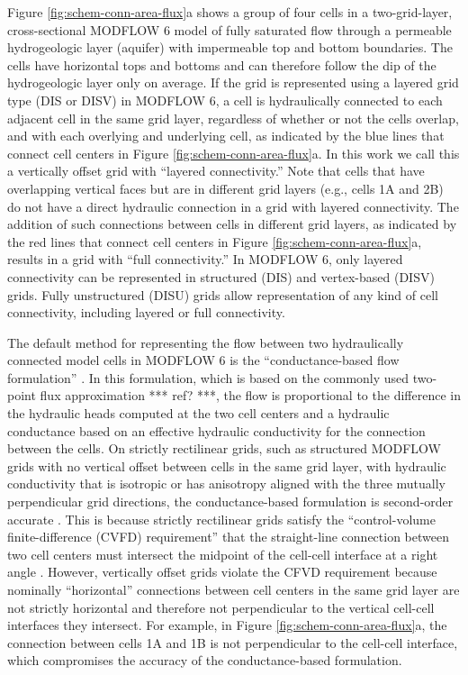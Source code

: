 \documentclass{article}
\begin{document}
Figure \ref{fig:schem-conn-area-flux}a shows a group of four cells in a two-grid-layer, cross-sectional MODFLOW 6 model of fully saturated flow through a permeable hydrogeologic layer (aquifer) with impermeable top and bottom boundaries. The cells have horizontal tops and bottoms and can therefore follow the dip of the hydrogeologic layer only on average. If the grid is represented using a layered grid type (DIS or DISV) in MODFLOW 6, a cell is hydraulically connected to each adjacent cell in the same grid layer, regardless of whether or not the cells overlap, and with each overlying and underlying cell, as indicated by the blue lines that connect cell centers in Figure \ref{fig:schem-conn-area-flux}a. In this work we call this a vertically offset grid with ``layered connectivity.''  Note that cells that have overlapping vertical faces but are in different grid layers (e.g., cells 1A and 2B) do not have a direct hydraulic connection in a grid with layered connectivity. The addition of such connections between cells in different grid layers, as indicated by the red lines that connect cell centers in Figure \ref{fig:schem-conn-area-flux}a, results in a grid with ``full connectivity.''  In MODFLOW 6, only layered connectivity can be represented in structured (DIS) and vertex-based (DISV) grids. Fully unstructured (DISU) grids allow representation of any kind of cell connectivity, including layered or full connectivity.

The default method for representing the flow between two hydraulically connected model cells in MODFLOW 6 is the ``conductance-based flow formulation'' \citep{modflow6gwf}. In this formulation, which is based on the commonly used two-point flux approximation {\color{red} *** ref? ***}, the flow is proportional to the difference in the hydraulic heads computed at the two cell centers and a hydraulic conductance based on an effective hydraulic conductivity for the connection between the cells. On strictly rectilinear grids, such as structured MODFLOW grids with no vertical offset between cells in the same grid layer, with hydraulic conductivity that is isotropic or has anisotropy aligned with the three mutually perpendicular grid directions, the conductance-based formulation is second-order accurate \citep{dehotin2010modeling, modflow6gwf}. This is because strictly rectilinear grids satisfy the ``control-volume finite-difference (CVFD) requirement'' that the straight-line connection between two cell centers must intersect the midpoint of the cell-cell interface at a right angle \citep{narasimhan1976integrated}. However, vertically offset grids violate the CFVD requirement because nominally ``horizontal'' connections between cell centers in the same grid layer are not strictly horizontal and therefore not perpendicular to the vertical cell-cell interfaces they intersect. For example, in Figure \ref{fig:schem-conn-area-flux}a, the connection between cells 1A and 1B is not perpendicular to the cell-cell interface, which compromises the accuracy of the conductance-based formulation.
\end{document}
